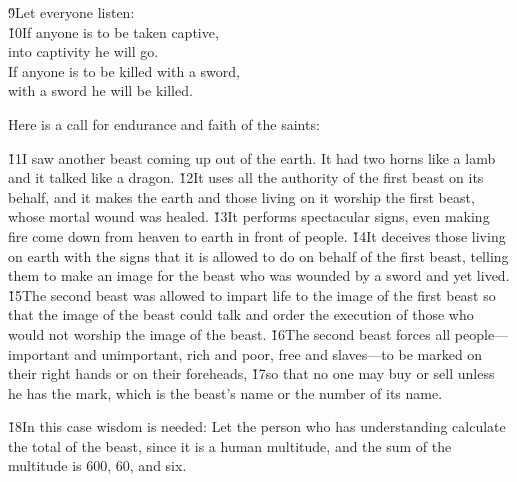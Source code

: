 \begin{poetry}
\poeml \v{9}Let everyone listen: \\
\poeml \v{10}If anyone is to be taken captive, \\
\poemlll       into captivity he will go. \\
\poeml If anyone is to be killed with a sword, \\
\poemll    with a sword he will be killed.
\end{poetry}

Here is a call for endurance and faith of the saints:

\v{11}I saw another beast coming up out of the earth. It had two horns like a lamb and it talked like a dragon. \v{12}It uses all the authority of the first beast on its behalf, and it makes the earth and those living on it worship the first beast, whose mortal wound was healed. \v{13}It performs spectacular signs, even making fire come down from heaven to earth in front of people. \v{14}It deceives those living on earth with the signs that it is allowed to do on behalf of the first beast, telling them to make an image for the beast who was wounded by a sword and yet lived. \v{15}The second beast was allowed to impart life to the image of the first beast so that the image of the beast could talk and order the execution of those who would not worship the image of the beast. \v{16}The second beast forces all people---important and unimportant, rich and poor, free and slaves---to be marked on their right hands or on their foreheads, \v{17}so that no one may buy or sell unless he has the mark, which is the beast's name or the number of its name.

\v{18}In this case wisdom is needed: Let the person who has understanding calculate the total of the beast, since it is a human multitude, and the sum of the multitude is 600, 60, and six.

